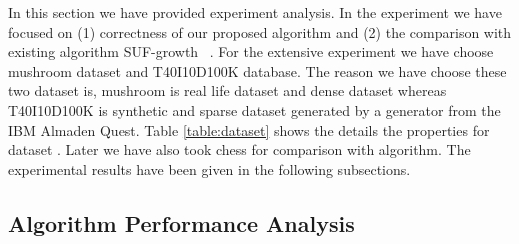 In this section we have provided experiment analysis. In the experiment we have focused on (1) correctness of our proposed algorithm and (2) the comparison with existing algorithm SUF-growth ~\cite{suf_growth}. For the extensive experiment we have choose mushroom dataset  and T40I10D100K database. The reason we have choose these two dataset is, mushroom  is real life dataset and dense dataset whereas T40I10D100K  is synthetic and sparse dataset generated by a generator from the IBM Almaden Quest. Table \ref{table:dataset} shows the details the properties for dataset . Later we have also took chess  for comparison with algorithm. The experimental results have been given in the following subsections.
\subsection{Algorithm Performance Analysis}
